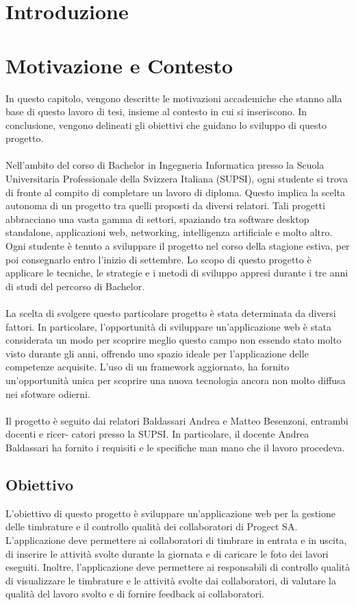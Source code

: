 \documentclass[twoside]{supsistudent}
\begin{document}
\chapter{Introduzione}
\chapter{Motivazione e Contesto}
In questo capitolo, vengono descritte le motivazioni accademiche che stanno alla base di
questo lavoro di tesi, insieme al contesto in cui si inseriscono. In conclusione, vengono
delineati gli obiettivi che guidano lo sviluppo di questo progetto.\\
\\
Nell'ambito del corso di Bachelor in Ingegneria Informatica presso la Scuola Universitaria
Professionale della Svizzera Italiana (SUPSI), ogni studente si trova di fronte al compito di
completare un lavoro di diploma. Questo implica la scelta autonoma di un progetto tra quelli
proposti da diversi relatori. Tali progetti abbracciano una vasta gamma di settori, spaziando
tra software desktop standalone, applicazioni web, networking, intelligenza artificiale e molto
altro. Ogni studente è tenuto a sviluppare il progetto nel corso della stagione estiva, per poi
consegnarlo entro l'inizio di settembre. Lo scopo di questo progetto è applicare le tecniche,
le strategie e i metodi di sviluppo appresi durante i tre anni di studi del percorso di Bachelor.\\
\\
La scelta di svolgere questo particolare progetto è stata determinata da diversi fattori. In
particolare, l'opportunità di sviluppare un'applicazione web è stata considerata un modo
per scoprire meglio questo campo non essendo stato molto visto durante gli anni, offrendo
uno spazio ideale per l'applicazione delle competenze acquisite. L'uso di un framework
aggiornato, ha fornito un'opportunità unica per scoprire una nuova tecnologia ancora non molto
diffusa nei sfotware odierni.\\
\\
Il progetto è seguito dai relatori Baldassari Andrea e Matteo Besenzoni, entrambi docenti e ricer-
catori presso la SUPSI. In particolare, il docente Andrea Baldassari ha fornito i requisiti e le specifiche man mano che il lavoro procedeva.

\section{Obiettivo}
L'obiettivo di questo progetto è sviluppare un'applicazione web per la gestione delle timbrature
e il controllo qualità dei collaboratori di Progect SA. L'applicazione deve permettere ai
collaboratori di timbrare in entrata e in uscita, di inserire le attività svolte durante la giornata
e di caricare le foto dei lavori eseguiti. Inoltre, l'applicazione deve permettere ai responsabili
di controllo qualità di visualizzare le timbrature e le attività svolte dai collaboratori, di
valutare la qualità del lavoro svolto e di fornire feedback ai collaboratori.\\
\\
\end{document}
